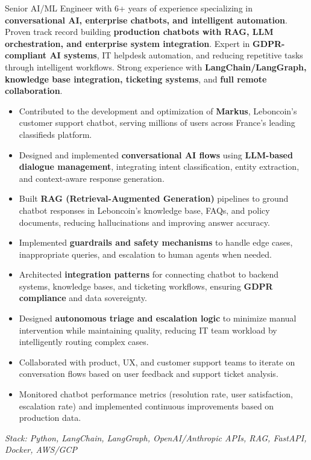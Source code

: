 \documentclass[10pt,a4paper]{altacv}
\begin{document}


\begin{fullwidth}
\makecvheader
\end{fullwidth}


Senior AI/ML Engineer with 6+ years of experience specializing in \textbf{conversational AI, enterprise chatbots, and intelligent automation}. Proven track record building \textbf{production chatbots with RAG, LLM orchestration, and enterprise system integration}. Expert in \textbf{GDPR-compliant AI systems}, IT helpdesk automation, and reducing repetitive tasks through intelligent workflows. Strong experience with \textbf{LangChain/LangGraph, knowledge base integration, ticketing systems}, and \textbf{full remote collaboration}.


\begin{itemize}
  \item Contributed to the development and optimization of \textbf{Markus}, Leboncoin's customer support chatbot, serving millions of users across France's leading classifieds platform.
  \item Designed and implemented \textbf{conversational AI flows} using \textbf{LLM-based dialogue management}, integrating intent classification, entity extraction, and context-aware response generation.
  \item Built \textbf{RAG (Retrieval-Augmented Generation)} pipelines to ground chatbot responses in Leboncoin's knowledge base, FAQs, and policy documents, reducing hallucinations and improving answer accuracy.
  \item Implemented \textbf{guardrails and safety mechanisms} to handle edge cases, inappropriate queries, and escalation to human agents when needed.
  \item Architected \textbf{integration patterns} for connecting chatbot to backend systems, knowledge bases, and ticketing workflows, ensuring \textbf{GDPR compliance} and data sovereignty.
  \item Designed \textbf{autonomous triage and escalation logic} to minimize manual intervention while maintaining quality, reducing IT team workload by intelligently routing complex cases.
  \item Collaborated with product, UX, and customer support teams to iterate on conversation flows based on user feedback and support ticket analysis.
  \item Monitored chatbot performance metrics (resolution rate, user satisfaction, escalation rate) and implemented continuous improvements based on production data.
\end{itemize}
\textit{Stack: Python, LangChain, LangGraph, OpenAI/Anthropic APIs, RAG, FastAPI, Docker, AWS/GCP}
\end{document}
